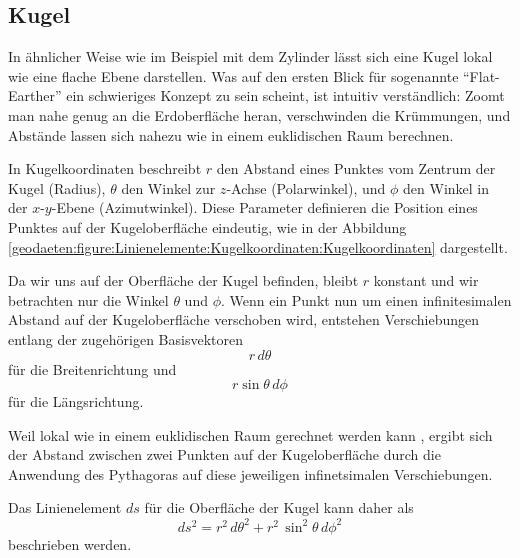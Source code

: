 %
%
%
%
\subsection{Kugel\label{geodaeten:section:Linienelement:Kugel}}

In ähnlicher Weise wie im Beispiel mit dem Zylinder lässt sich eine Kugel lokal wie eine flache Ebene darstellen.
Was auf den ersten Blick für sogenannte ``Flat-Earther'' ein schwieriges Konzept zu sein scheint, ist intuitiv verständlich:
Zoomt man nahe genug an die Erdoberfläche heran, verschwinden die Krümmungen, und Abstände lassen sich nahezu wie in einem euklidischen Raum berechnen.

In Kugelkoordinaten beschreibt $r$ den Abstand eines Punktes vom Zentrum der Kugel (Radius), $\theta$ den Winkel zur $z$-Achse (Polarwinkel), und $\phi$ den Winkel in der $x$-$y$-Ebene (Azimutwinkel).
Diese Parameter definieren die Position eines Punktes auf der Kugeloberfläche eindeutig, wie in der Abbildung \ref{geodaeten:figure:Linienelemente:Kugelkoordinaten:Kugelkoordinaten} dargestellt.

Da wir uns auf der Oberfläche der Kugel befinden, bleibt $r$ konstant und wir betrachten nur die Winkel $\theta$ und $\phi$.
Wenn ein Punkt nun um einen infinitesimalen Abstand auf der Kugeloberfläche verschoben wird, entstehen Verschiebungen entlang der zugehörigen Basisvektoren 
\begin{equation}
	r \, d\theta
\end{equation}
für die Breitenrichtung und
\begin{equation}
	r \sin\theta \, d\phi
\end{equation} 
für die Längsrichtung.

Weil lokal wie in einem euklidischen Raum gerechnet werden kann , ergibt sich der Abstand zwischen zwei Punkten auf der Kugeloberfläche durch die Anwendung des Pythagoras auf diese jeweiligen infinetsimalen Verschiebungen.

Das Linienelement $ds$ für die Oberfläche der Kugel kann daher als
\begin{equation}
	ds^2 = r^2 \, d\theta^2 + r^2 \, \sin^2\theta \, d\phi^2
\end{equation}
beschrieben werden.

